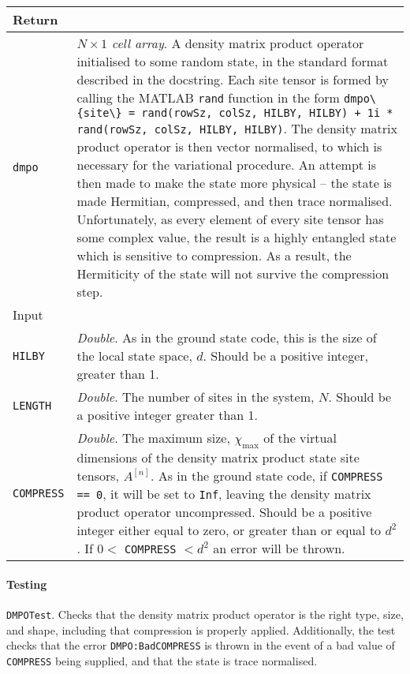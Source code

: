  \begin{longtabu}{X[1,l]X[4,l]}
 \hline
 Return & \\ \hline
 \lstinline$dmpo$ & \emph{\(N \times 1\) cell array}. A density matrix product operator initialised to some random state, in the standard format described in the docstring. Each site tensor is formed by calling the MATLAB \lstinline$rand$ function in the form \lstinline$dmpo\{site\} = rand(rowSz, colSz, HILBY, HILBY) + 1i * rand(rowSz, colSz, HILBY, HILBY)$. The density matrix product operator is then vector normalised, to which is necessary for the variational procedure. An attempt is then made to make the state more physical -- the state is made Hermitian, compressed, and then trace normalised. Unfortunately, as every element of every site tensor has some complex value, the result is a highly entangled state which is sensitive to compression. As a result, the Hermiticity of the state will not survive the compression step. \\ \hline
 Input & \\ \hline
 \lstinline$HILBY$ & \emph{Double}. As in the ground state code, this is the size of the local state space, \(d\). Should be a positive integer, greater than 1.  \\
 \lstinline$LENGTH$ & \emph{Double}. The number of sites in the system, \(N\). Should be a positive integer greater than 1. \\
 \lstinline$COMPRESS$ & \emph{Double}. The maximum size, \(\chi_{\mathrm{max}}\) of the virtual dimensions of the density matrix product state site tensors, \(A^{[n]}\). As in the ground state code, if \lstinline$COMPRESS == 0$, it will be set to \lstinline$Inf$, leaving the density matrix product operator uncompressed. Should be a positive integer either equal to zero, or greater than or equal to \(d^{2}\). If \(0 <\) \lstinline$COMPRESS$ \(< d^{2}\) an error will be thrown. \\
 \hline
 \end{longtabu}
 \paragraph{Testing} \lstinline$DMPOTest$. Checks that the density matrix product operator is the right type, size, and shape, including that compression is properly applied. Additionally, the test checks that the error \lstinline$DMPO:BadCOMPRESS$ is thrown in the event of a bad value of \lstinline$COMPRESS$ being supplied, and that the state is trace normalised.
  
